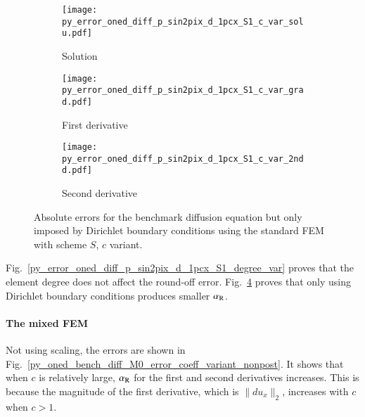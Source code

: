 \documentclass[review,3p]{elsarticle}
\begin{document}
\begin{figure}[!ht]
    \begin{subfigure}{5.5cm}
        \texttt{[image: py\_error\_oned\_diff\_p\_sin2pix\_d\_1pcx\_S1\_c\_var\_solu.pdf]}
        \caption{Solution}
        \label{py_error_oned_diff_p_sin2pix_d_1pcx_S1_c_var_solu}
    \end{subfigure}
    \hspace{-0.2cm}
    \begin{subfigure}{5.5cm}
        \texttt{[image: py\_error\_oned\_diff\_p\_sin2pix\_d\_1pcx\_S1\_c\_var\_grad.pdf]}
        \caption{First derivative}
        \label{py_error_oned_diff_p_sin2pix_d_1pcx_S1_c_var_grad}
    \end{subfigure}
    \hspace{-0.2cm}
    \begin{subfigure}{5.5cm}
        \texttt{[image: py\_error\_oned\_diff\_p\_sin2pix\_d\_1pcx\_S1\_c\_var\_2ndd.pdf]}
        \caption{Second derivative}
        \label{py_error_oned_diff_p_sin2pix_d_1pcx_S1_c_var_2ndd}
    \end{subfigure}
\caption{Absolute errors for the benchmark diffusion equation but only imposed by Dirichlet boundary conditions using the standard FEM with scheme $S$, $c$ variant.}
\label{py_error_oned_diff_p_sin2pix_d_1pcx_S1_c_var}
\end{figure}

Fig.~\ref{py_error_oned_diff_p_sin2pix_d_1pcx_S1_degree_var} proves that the element degree does not affect the round-off error.
Fig.~\ref{py_error_oned_diff_p_sin2pix_d_1pcx_S1_c_var} proves that only using Dirichlet boundary conditions produces smaller $\alpha_{\rm R}$.

\paragraph{The mixed FEM}
Not using scaling, the errors are shown in Fig.~\ref{py_oned_bench_diff_M0_error_coeff_variant_nonpost}.
It shows that when $c$ is relatively large, $\alpha_{\rm R}$ for the first and second derivatives increases. This is because the magnitude of the first derivative, which is $\|du_x\|_2$, increases with $c$ when $c>1$.
\end{document}

